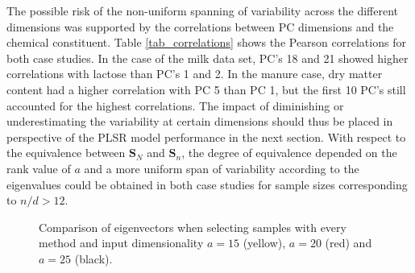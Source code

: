 \documentclass[journal=ancham,manuscript=article]{achemso}
\begin{document}
The possible risk of the non-uniform spanning of variability across the different dimensions was supported by the correlations between PC dimensions and the chemical constituent. Table \ref{tab_correlations} shows the Pearson correlations for both case studies. In the case of the milk data set, PC's 18 and 21 showed higher correlations with lactose than PC's 1 and 2. In the manure case, dry matter content had a higher correlation with PC 5 than PC 1, but the first 10 PC's still accounted for the highest correlations. The impact of diminishing or underestimating the variability at certain dimensions should thus be placed in perspective of the PLSR model performance in the next section. With respect to the equivalence between $\mathbf{S}_N$ and $\mathbf{S}_n$, the degree of equivalence depended on the rank value of $a$ and a more uniform span of variability according to the eigenvalues could be obtained in both case studies for sample sizes corresponding to $n/d>12$.  




\begin{figure}[t]
    \centering
    \caption{Comparison of eigenvectors when selecting samples with every method and input dimensionality $a=15$ (yellow), $a=20$ (red) and $a=25$ (black).}
    \label{fig_specific_framework_detereigevect}
\end{figure}
\end{document}
